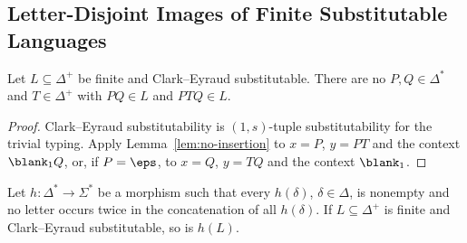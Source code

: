 \subsection{Letter-Disjoint Images of Finite Substitutable Languages}

\begin{lemma}\label{lem:app-u1-insertion}
Let $L\subseteq\Delta^+$ be finite and Clark--Eyraud substitutable.  There are no
$P,Q\in\Delta^*$ and $T\in\Delta^+$ with $PQ\in L$ and $PTQ\in L$.
\end{lemma}

\begin{proof}
Clark--Eyraud substitutability is $(1,s)$-tuple substitutability for the trivial
typing.  Apply Lemma~\ref{lem:no-insertion} to $x=P$, $y=PT$ and the context
$\blank_1Q$, or, if $P=\eps$, to $x=Q$, $y=TQ$ and the context $\blank_1$.
\end{proof}

\begin{lemma}\label{lem:app-u1-code}
Let $h:\Delta^*\to\Sigma^*$ be a morphism such that every $h(\delta)$,
$\delta\in\Delta$, is nonempty and no letter occurs twice in the concatenation of
all $h(\delta)$.  If $L\subseteq\Delta^+$ is finite and Clark--Eyraud
substitutable, so is $h(L)$.
\end{lemma}

